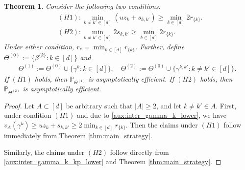 \documentclass[aap,preprint]{imsart}
\newcommand{\Pro}{{\mathbb{P}}}
\newcommand{\bR}{{\mathbb{R}}}
\theoremstyle{plain}
\newtheorem{theorem}{Theorem}[section]
\theoremstyle{definition}
\begin{document}
\begin{theorem}\label{thm:sufficient}
Consider the following two conditions.
\begin{align*}
& (H1): \min_{k \neq k' \in [d] } \left(u z_k + s_{k,k'}\right) \geq \min_{k \in [d]} 2 r_{\{k\}}.\\
& (H2): \min_{k \neq k' \in [d] } 2s_{k,k'} \geq  \min_{k \in [d]} 2r_{\{k\}}.
\end{align*}
Under either condition, $r_* = \min_{k \in [d]} r_{\{k\}}$. Further, define $\Theta^{(0)}  :=  \{\beta^{\{k\}}: k \in [d]\}$ and
\begin{align*}
\Theta^{(1)}  :=  \Theta^{(0)} \cup \{\gamma^{k}: k \in [d]\},\quad
\Theta^{(2)}  :=  \Theta^{(0)} \cup \{\gamma^{k,k'}: k \neq k' \in [d]\}.
\end{align*}
If $(H1)$ holds, then $\Pro_{\Theta^{(1)}}$ is asymptotically efficient. If $(H2)$ holds, then $\Pro_{\Theta^{(2)}}$ is asymptotically efficient.
\end{theorem}
\begin{proof}
Let $A \subset [d]$ be arbitrary such that $|A| \geq 2$, and let $k \neq k' \in A$. First, under condition $(H1)$ and due to \eqref{aux:inter_gamma_k_lower}, we have $v_A(\gamma^k) \geq u z_k + s_{k,k'} \geq 2 \min_{k \in [d]} r_{\{k\}}$. Then the claims under $(H1)$ follow immediately from Theorem \ref{thm:main_strategy}. 

Similarly, the claims under $(H2)$ follow directly from \eqref{aux:inter_gamma_k_kp_lower} and Theorem \ref{thm:main_strategy}.
\end{proof}

\end{document}
